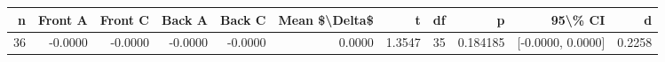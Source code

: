 \begin{tabular}{rrrrrrrrrrr}
\toprule
n & Front A & Front C & Back A & Back C & Mean \$\textbackslash{}Delta\$ & t & df & p & 95\textbackslash{}\% CI & d\\
\midrule
36 & -0.0000 & -0.0000 & -0.0000 & -0.0000 & 0.0000 & 1.3547 & 35 & 0.184185 & [-0.0000, 0.0000] & 0.2258\\
\bottomrule
\end{tabular}
